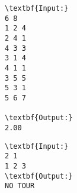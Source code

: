 \begin{verbatim}
\textbf{Input:}
6 8
1 2 4 
2 4 1 
4 3 3 
3 1 4 
4 1 1 
3 5 5 
5 3 1 
5 6 7

\textbf{Output:}
2.00
\end{verbatim}


\begin{verbatim}
\textbf{Input:}
2 1
1 2 3
\textbf{Output:}
NO TOUR
\end{verbatim}